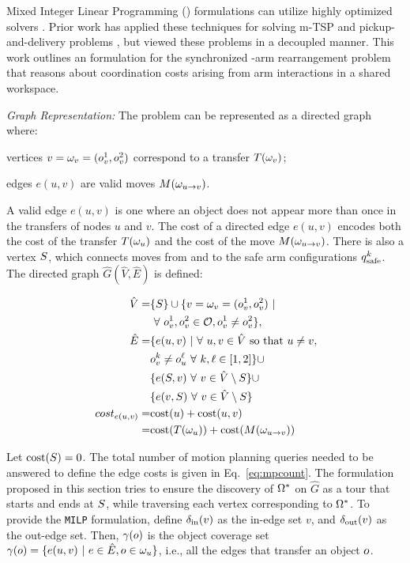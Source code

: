 Mixed Integer Linear Programming (\milp) formulations can utilize highly optimized solvers \cite{gurobi}. Prior work has applied these techniques for solving m-TSP \cite{rathinam2006matroid,friggstad2013multiple} and pickup-and-delivery problems \cite{coltin2014multi,savelsbergh1995general}, but viewed these problems in a decoupled manner. This work outlines an \milp formulation for the synchronized \dual-arm rearrangement problem that reasons about coordination costs arising from arm interactions in a shared workspace.

\textit{Graph Representation:}
The problem can be represented as a directed graph where:
\begin{myitem}
\item vertices $v = {\omega}_v = (o_v^1, o_v^2)$ correspond to a transfer $ T({\omega}_v) $;
\item edges $e(u,v)$ are valid moves $M({\omega}_{u\rightarrow v})$.
\end{myitem} 
A valid edge $e(u,v)$ is one where an object does not appear more than once in the transfers of nodes $u$ and $v$.  The cost of a directed edge $e(u,v)$ encodes both the cost of the transfer  $ T({\omega}_u) $ and the cost of the move $M({\omega}_{u\rightarrow v})$. There is also a vertex $ S $, which connects moves from and to the safe arm configurations $q^k_{\rm safe}$.  The directed graph $ \hat{G} (\hat{V},\hat{E}) $ is defined:

\vspace{-.1in}
\begin{align*}
\hspace{0.5in} \hat{V} =& \{S\} \cup \{ v = {\omega}_v = (o_v^1,o_v^2)\ |\\& \  \forall\ o_v^1,o_v^2 \in \mathcal{O}, o_v^1 \neq o_v^2 \}, \\
\hat{E} =& \{  e(u,v)\ | \ \forall\ u,v\in \hat{V} \textrm{ so that } u\neq v,\ \\& 
o_v^k \neq o_u^{\ell}\ \forall\ k, \ell \in [1,2] \}
\cup\ \\&
 \{e(S,v)\ \forall\ v\in\hat{V}\setminus S\} \cup \\& \{e(v,S)\ \forall\ v\in\hat{V}\setminus S\}\\
cost_{e(u,v)} = & \textup{cost}(u) + \textup{cost}(u,v)\\ = &\textup{cost}(T({\omega}_u)) + \textup{cost}(M({\omega}_{u\rightarrow v}))
\end{align*}

Let $\textup{cost}(S) = 0$. The total number of motion planning queries needed to be answered to define the edge costs is given in Eq.~\ref{eq:mpcount}. The formulation proposed in this section tries to ensure the discovery of $ {{\Omega}}^* $ on $ \hat{G} $ as a tour that starts and ends at $ S $, while traversing each vertex corresponding to $ {{\Omega}}^* $. To provide the {\tt MILP} formulation, define $ \delta_{\rm in}(v) $ as the in-edge set $v$, and  $ \delta_{\rm out}(v) $ as the out-edge set. Then, $ \gamma(o) $ is the object coverage set $ \gamma(o) = \{ e(u,v) \ |\ e\in\hat{E}, o\in  {\omega}_u  \} $, i.e., all the edges that transfer an object $ o $.


